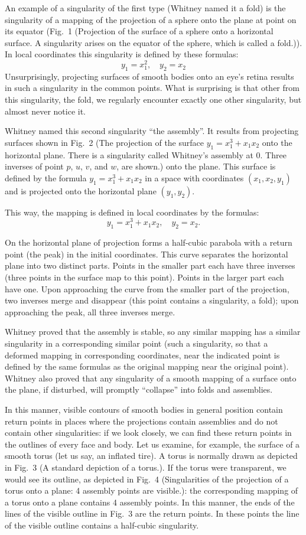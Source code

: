 \documentclass[12pt]{amsart}
\begin{document}
An example of a singularity of the first type (Whitney named it a fold) is the
singularity of a mapping of the projection of a sphere onto the plane at point
on its equator (Fig.~1 (Projection of the surface of a sphere onto a horizontal
surface.
A singularity arises on the equator of the sphere, which is called a fold.)).
In local coordinates this singularity is defined by these formulas:
$$y_1=x_1^2,\quad y_2=x_2$$
Unsurprisingly, projecting surfaces of smooth bodies onto an eye's retina
results in such a singularity in the common points.
What is surprising is that other from this singularity, the fold, we regularly
encounter exactly one other singularity, but almost never notice it.

Whitney named this second singularity ``the assembly''.
It results from projecting surfaces shown in Fig.~2 (The projection of the
surface $y_1=x_1^3+x_1x_2$ onto the horizontal plane.
There is a singularity called Whitney's assembly at 0.
Three inverses of point $p$, $u$, $v$, and $w$, are shown.) onto the plane.
This surface is defined by the formula $y_1=x_1^3+x_1x_2$ in a space with
coordinates $(x_1,x_2,y_1)$ and is projected onto the horizontal plane
$(y_1,y_2)$.

This way, the mapping is defined in local coordinates by the formulas:
$$y_1=x_1^3+x_1x_2,\quad y_2=x_2.$$

On the horizontal plane of projection forms a half-cubic parabola with a return
point (the peak) in the initial coordinates.
This curve separates the horizontal plane into two distinct parts.
Points in the smaller part each have three inverses (three points in the surface
map to this point).
Points in the larger part each have one.
Upon approaching the curve from the smaller part of the projection, two inverses
merge and disappear (this point contains a singularity, a fold); upon
approaching the peak, all three inverses merge.

Whitney proved that the assembly is stable, so any similar mapping has a
similar singularity in a corresponding similar point (such a singularity, so
that a deformed mapping in corresponding coordinates, near the indicated point
is defined by the same formulas as the original mapping near the original point).
Whitney also proved that any singularity of a smooth mapping of a surface onto
the plane, if disturbed, will promptly ``collapse'' into folds and assemblies.

In this manner, visible contours of smooth bodies in general position contain
return points in places where the projections contain assemblies and do not
contain other singularities: if we look closely, we can find these return points
in the outlines of every face and body.
Let us examine, for example, the surface of a smooth torus (let us say, an
inflated tire).
A torus is normally drawn as depicted in Fig.~3 (A standard depiction of a
torus.).
If the torus were transparent, we would see its outline, as depicted in Fig.~4
(Singularities of the projection of a torus onto a plane: 4 assembly points are
visible.): the corresponding mapping of a torus onto a plane contains 4 assembly
points.
In this manner, the ends of the lines of the visible outline in Fig.~3 are the
return points.
In these points the line of the visible outline contains a half-cubic singularity.
\end{document}
